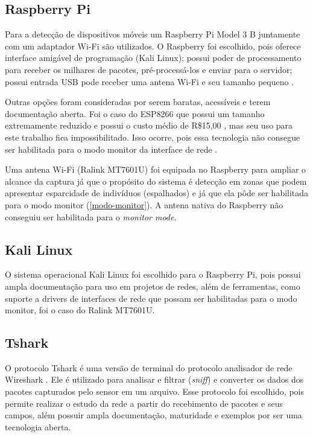 \subsection{Raspberry Pi}
Para a detecção de dispositivos móveis um Raspberry Pi Model 3 B juntamente com um adaptador Wi-Fi são utilizados. O Raspberry foi escolhido,
pois oferece interface amigável de programação (Kali Linux); possui poder de processamento para receber os milhares de pacotes, pré-processá-los
e enviar para o servidor; possui entrada USB pode receber uma antena Wi-Fi e seu tamanho pequeno \cite{rpi2017}.

Outras opções foram consideradas por serem baratas, acessíveis e terem documentação aberta. Foi o caso do ESP8266 que possui um tamanho extremamente
reduzido e possui o custo médio de R\$15,00 \cite{Embarcados2015}, mas seu uso para este trabalho fica impossibilitado. Isso
ocorre, pois essa tecnologia não consegue ser habilitada para o modo monitor da interface de rede \cite{Puhl2016} \cite{Ferreira2016}.

Uma antena Wi-Fi (Ralink MT7601U) foi equipada no Raspberry para ampliar o alcance da captura já que o propósito do sistema é detecção em zonas que podem
apresentar esparcidade de indivíduos (espalhados) e já que ela pôde ser habilitada para o modo monitor (\autoref{modo-monitor}). A antena nativa
do Raspberry não conseguiu ser habilitada para o \emph{monitor mode}.

\subsection{Kali Linux}
O sistema operacional Kali Linux \cite{kali} foi escolhido para o Raspberry Pi, pois possui ampla documentação
para uso em projetos de redes, além de ferramentas, como suporte a drivers de interfaces de rede que possam
ser habilitadas para o modo monitor, foi o caso do Ralink MT7601U.

\subsection{Tshark}
O protocolo Tshark é uma versão de terminal do protocolo
analisador de rede Wireshark \cite{Wireshark2017} \cite{Wireshark2017a}. Ele é
utilizado para analisar e filtrar (\emph{sniff}) e converter os dados dos
pacotes capturados pelo sensor em um arquivo. Esse protocolo foi
escolhido, pois permite realizar o estudo da rede a partir do recebimento de
pacotes e seus campos, além possuir ampla documentação, maturidade e exemplos
por ser uma tecnologia aberta.
